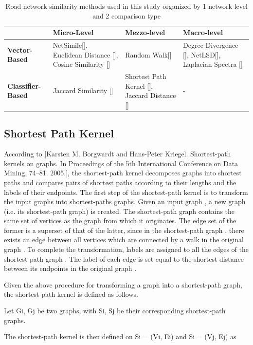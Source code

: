 \begin{table}[!h]
\centering
\begin{tabular}{ |p{3cm}|p{3cm}|p{3cm}| p{3cm} | }
\hline
& \textbf{Micro-Level} & \textbf{Mezzo-level} & \textbf{Macro-level} \\ \hline
\textbf{Vector-Based} & NetSimile[], Euclidean Distance [], Cosine Similarity [] & Random Walk[] & Degree Divergence [], NetLSD[], Laplacian Spectra [] \\ \hline
\textbf{Classifier-Based} & Jaccard Similarity [] & Shortest Path Kernel [], Jaccard Distance [] & - \\ \hline
\end{tabular}
\caption{Road network similarity methods used in this study organized by 1 network level and 2 comparison type}
\label{tab:Road Network Similarity Methods}
\end{table}

\subsection{Shortest Path Kernel}

According to [Karsten M. Borgwardt and Hans-Peter Kriegel. Shortest-path kernels on graphs. In Proceedings of the 5th International Conference on Data Mining, 74–81. 2005.], the shortest-path kernel decomposes graphs into shortest paths and compares pairs of shortest paths according to their lengths and the labels of their endpoints. The first step of the shortest-path kernel is to transform the input graphs into shortest-paths graphs. Given an input graph , a new graph  (i.e. its shortest-path graph) is created. The shortest-path graph  contains the same set of vertices as the graph from which it originates. The edge set of the former is a superset of that of the latter, since in the shortest-path graph , there exists an edge between all vertices which are connected by a walk in the original graph . To complete the transformation, labels are assigned to all the edges of the shortest-path graph . The label of each edge is set equal to the shortest distance between its endpoints in the original graph .

Given the above procedure for transforming a graph into a shortest-path graph, the shortest-path kernel is defined as follows.

Let Gi, Gj be two graphs, with Si, Sj be their corresponding shortest-path graphs.

The shortest-path kernel is then defined on Si  = (Vi, Ei) and Si = (Vj, Ej) as

